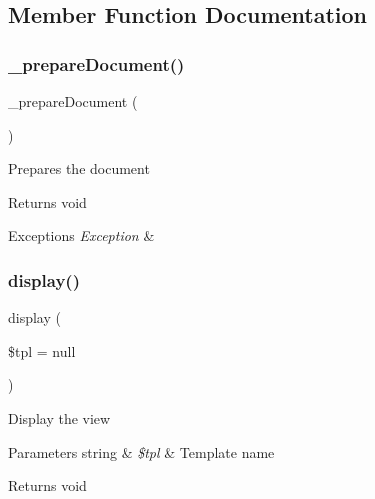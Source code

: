 \subsection{Member Function Documentation}
\mbox{\label{classtks__agenda_view_itemeditform_aa6beb02534f5e57801141ad50e7adec5}} 
\subsubsection{\+\_\+prepare\+Document()}
{\footnotesize\ttfamily \+\_\+prepare\+Document (\begin{DoxyParamCaption}{ }\end{DoxyParamCaption})\hspace{0.3cm}{\ttfamily [protected]}}

Prepares the document

\begin{DoxyReturn}{Returns}
void
\end{DoxyReturn}

\begin{DoxyExceptions}{Exceptions}
{\em Exception} & \\
\hline
\end{DoxyExceptions}
\mbox{\label{classtks__agenda_view_itemeditform_aa988850da0dbeb9875debea0280754d5}} 
\subsubsection{display()}
{\footnotesize\ttfamily display (\begin{DoxyParamCaption}\item[{}]{\$tpl = {\ttfamily null} }\end{DoxyParamCaption})}

Display the view


\begin{DoxyParams}[1]{Parameters}
string & {\em \$tpl} & Template name\\
\hline
\end{DoxyParams}
\begin{DoxyReturn}{Returns}
void
\end{DoxyReturn}

